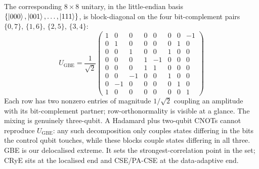 \documentclass[conference,compsoc]{IEEEtran}
\begin{document}
The corresponding $8 \times 8$ unitary, in the little-endian basis $\{\ket{000},\ket{001},\ldots,\ket{111}\}$, is block-diagonal on the four bit-complement pairs $\{0,7\}$, $\{1,6\}$, $\{2,5\}$, $\{3,4\}$:
\begin{equation}
    U_\text{GBE} = \frac{1}{\sqrt{2}}
    \begin{pmatrix}
    1 & 0 & 0 & 0 & 0 & 0 & 0 & -1 \\
    0 & 1 & 0 & 0 & 0 & 0 & 1 & 0 \\
    0 & 0 & 1 & 0 & 0 & 1 & 0 & 0 \\
    0 & 0 & 0 & 1 & -1 & 0 & 0 & 0 \\
    0 & 0 & 0 & 1 & 1 & 0 & 0 & 0 \\
    0 & 0 & -1 & 0 & 0 & 1 & 0 & 0 \\
    0 & -1 & 0 & 0 & 0 & 0 & 1 & 0 \\
    1 & 0 & 0 & 0 & 0 & 0 & 0 & 1
    \end{pmatrix}
    \label{eq:u_gbe}
\end{equation}
Each row has two nonzero entries of magnitude $1/\sqrt{2}$ coupling an amplitude with its bit-complement partner; row-orthonormality is visible at a glance. The mixing is genuinely three-qubit. A Hadamard plus two-qubit CNOTs cannot reproduce $U_\text{GBE}$: any such decomposition only couples states differing in the bits the control qubit touches, while these blocks couple states differing in all three. GBE is our delocalised extreme. It sets the strongest-correlation point in the set; CRyE sits at the localised end and CSE/PA-CSE at the data-adaptive end.
\end{document}
